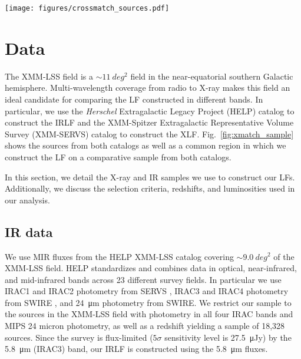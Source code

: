\documentclass[twocolumn, trackchanges]{aastex63}
\begin{document}
\begin{figure*}[tphb]
\centering
\texttt{[image: figures/crossmatch\_sources.pdf]}
\caption{Footprint of the HELP catalog (red) and XMM-SERVS catalog (blue) in the XMM-LSS field. There are 30,271 IR sources in the HELP catalog and 5242 X-ray sources in the XMM-SERVS catalog. The black box indicates the subregion used for the comparative sample (described in \S\ref{sec:crossmatch}).}
\label{fig:xmatch_sample}
\end{figure*}


\section{Data}
\label{sec:sample}
The XMM-LSS field is a $\sim\SI{11}{deg^2}$ field in the near-equatorial southern Galactic hemisphere.
Multi-wavelength coverage from radio to X-ray makes this field an ideal candidate for comparing the LF constructed in different bands.
In particular, we use the \textit{Herschel} Extragalactic Legacy Project (HELP) catalog \citep{shirley_help_2019, shirley_help_2021} to construct the IRLF and the XMM-Spitzer Extragalactic Representative Volume Survey (XMM-SERVS) catalog \citep{chen_xmm-servs_2018} to construct the XLF.
Fig.~\ref{fig:xmatch_sample} shows the sources from both catalogs as well as a common region in which we construct the LF on a comparative sample from both catalogs.

In this section, we detail the X-ray and IR samples we use to construct our LFs. 
Additionally, we discuss the selection criteria, redshifts, and luminosities used in our analysis.

\subsection{IR data}
We use MIR fluxes from the HELP \citep{shirley_help_2021} XMM-LSS catalog covering $\sim \SI{9.0}{deg^2}$ of the XMM-LSS field.
HELP standardizes and combines data in optical, near-infrared, and mid-infrared bands across 23 different survey fields. 
In particular we use IRAC1 and IRAC2 photometry from SERVS \citep{mauduit_spitzer_2012}, IRAC3 and IRAC4 photometry from SWIRE \citep{lonsdale_swire_2003}, and \SI{24}{\micro m} photometry from SWIRE.
We restrict our sample to the sources in the XMM-LSS field with photometry in all four IRAC bands and MIPS 24 micron photometry, as well as a redshift yielding a sample of 18,328 sources.
Since the survey is flux-limited ($5\sigma$ sensitivity level is \SI{27.5}{\micro Jy}) by the \SI{5.8}{\micro\meter} (IRAC3) band, our IRLF is constructed using the \SI{5.8}{\micro m} fluxes.
\end{document}

